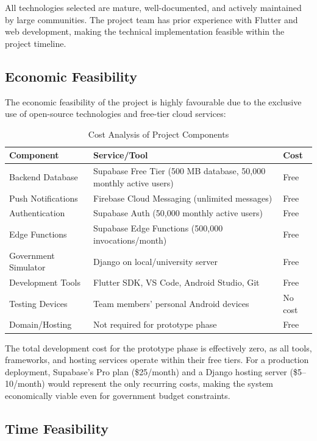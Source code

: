 All technologies selected are mature, well-documented, and actively maintained by large communities. The project team has prior experience with Flutter and web development, making the technical implementation feasible within the project timeline.

\subsection{Economic Feasibility}

The economic feasibility of the project is highly favourable due to the exclusive use of open-source technologies and free-tier cloud services:

\begin{table}[H]
\centering
\caption{Cost Analysis of Project Components}
\begin{tabularx}{\textwidth}{|l|X|l|}
\hline
\textbf{Component} & \textbf{Service/Tool} & \textbf{Cost} \\
\hline
Backend Database & Supabase Free Tier (500 MB database, 50,000 monthly active users) & Free \\
\hline
Push Notifications & Firebase Cloud Messaging (unlimited messages) & Free \\
\hline
Authentication & Supabase Auth (50,000 monthly active users) & Free \\
\hline
Edge Functions & Supabase Edge Functions (500,000 invocations/month) & Free \\
\hline
Government Simulator & Django on local/university server & Free \\
\hline
Development Tools & Flutter SDK, VS Code, Android Studio, Git & Free \\
\hline
Testing Devices & Team members' personal Android devices & No cost \\
\hline
Domain/Hosting & Not required for prototype phase & Free \\
\hline
\end{tabularx}
\end{table}

The total development cost for the prototype phase is effectively zero, as all tools, frameworks, and hosting services operate within their free tiers. For a production deployment, Supabase's Pro plan (\$25/month) and a Django hosting server (\$5--10/month) would represent the only recurring costs, making the system economically viable even for government budget constraints.

\subsection{Time Feasibility}

